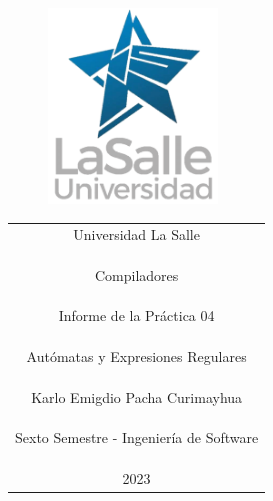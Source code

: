 \documentclass[https://www.overleaf.com/project/63761df255a8a9f4a15c3579
	letterpaper, %
	10pt, %
]{CSUniSchoolLabReport}
\begin{document}
\begin{figure}[H] %
	\centering %
	\includegraphics[width=0.4\textwidth]{images/logo.png} %
\end{figure}

\begin{center}
    \begin{tabular} {c}
        \Huge Universidad La Salle \\\\\\\\
        \huge Compiladores \\\\\\\\
        \LARGE Informe de la Práctica 04 \\\\\\\\
        \huge Autómatas y Expresiones Regulares \\\\\\\\
        \LARGE Karlo Emigdio Pacha Curimayhua \\\\\\\\
        \LARGE Sexto Semestre - Ingeniería de Software \\\\\\\\
        \LARGE 2023
      \end{tabular}
\end{center}

\begin{center}
	\begin{tabular}{l r}
	\end{tabular}
\end{center}
\end{document}

